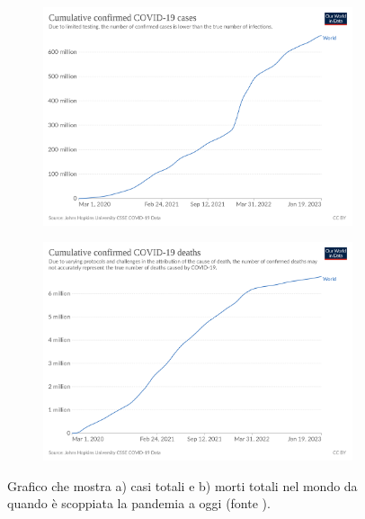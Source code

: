 \documentclass[12pt,italian]{report}
\begin{document}
	\begin{figure}[h!]
		\centering
		\begin{subfigure}[b]{0.85\textwidth}
			\centering
			\includegraphics[width=0.90\linewidth]{immagini/coronavirus-data-explorer_cases}
			\caption{}
			\label{fig:coronavirus-data-explorercases}
		\end{subfigure}
		\begin{subfigure}[b]{0.85\textwidth}
			\centering
			\includegraphics[width=0.90\linewidth]{immagini/coronavirus-data-explorer_death}
			\caption{}
			\label{fig:coronavirus-data-explorerdeath}
		\end{subfigure}
	\caption{Grafico che mostra a) casi totali e b) morti totali nel mondo da quando è scoppiata la pandemia a oggi (fonte \cite{covidExplorer}).}
	\label{fig:COVID_deaths_and_cases}
	\end{figure}
\end{document}
